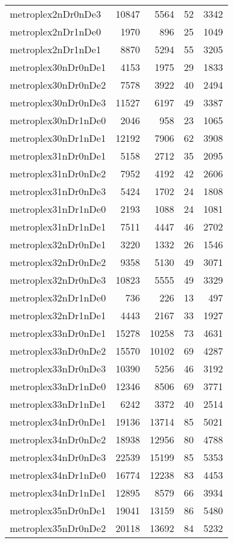 \begin{longtable}{lrrrr}
metroplex2nDr0nDe3 & 10847 & 5564 & 52 & 3342 \\
metroplex2nDr1nDe0 & 1970 & 896 & 25 & 1049 \\
metroplex2nDr1nDe1 & 8870 & 5294 & 55 & 3205 \\
metroplex30nDr0nDe1 & 4153 & 1975 & 29 & 1833 \\
metroplex30nDr0nDe2 & 7578 & 3922 & 40 & 2494 \\
metroplex30nDr0nDe3 & 11527 & 6197 & 49 & 3387 \\
metroplex30nDr1nDe0 & 2046 & 958 & 23 & 1065 \\
metroplex30nDr1nDe1 & 12192 & 7906 & 62 & 3908 \\
metroplex31nDr0nDe1 & 5158 & 2712 & 35 & 2095 \\
metroplex31nDr0nDe2 & 7952 & 4192 & 42 & 2606 \\
metroplex31nDr0nDe3 & 5424 & 1702 & 24 & 1808 \\
metroplex31nDr1nDe0 & 2193 & 1088 & 24 & 1081 \\
metroplex31nDr1nDe1 & 7511 & 4447 & 46 & 2702 \\
metroplex32nDr0nDe1 & 3220 & 1332 & 26 & 1546 \\
metroplex32nDr0nDe2 & 9358 & 5130 & 49 & 3071 \\
metroplex32nDr0nDe3 & 10823 & 5555 & 49 & 3329 \\
metroplex32nDr1nDe0 & 736 & 226 & 13 & 497 \\
metroplex32nDr1nDe1 & 4443 & 2167 & 33 & 1927 \\
metroplex33nDr0nDe1 & 15278 & 10258 & 73 & 4631 \\
metroplex33nDr0nDe2 & 15570 & 10102 & 69 & 4287 \\
metroplex33nDr0nDe3 & 10390 & 5256 & 46 & 3192 \\
metroplex33nDr1nDe0 & 12346 & 8506 & 69 & 3771 \\
metroplex33nDr1nDe1 & 6242 & 3372 & 40 & 2514 \\
metroplex34nDr0nDe1 & 19136 & 13714 & 85 & 5021 \\
metroplex34nDr0nDe2 & 18938 & 12956 & 80 & 4788 \\
metroplex34nDr0nDe3 & 22539 & 15199 & 85 & 5353 \\
metroplex34nDr1nDe0 & 16774 & 12238 & 83 & 4453 \\
metroplex34nDr1nDe1 & 12895 & 8579 & 66 & 3934 \\
metroplex35nDr0nDe1 & 19041 & 13159 & 86 & 5480 \\
metroplex35nDr0nDe2 & 20118 & 13692 & 84 & 5232 \\

\end{longtable}
